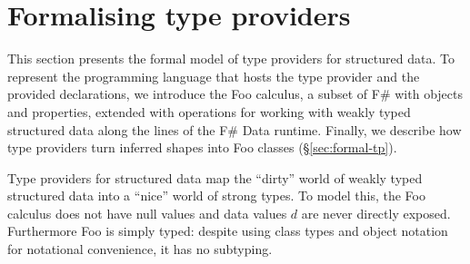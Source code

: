 \documentclass[10pt,preprint,clearpagebib]{sigplanconf}
\newcommand{\kvd}[1]{\textnormal{\textcolor{kvdclr}{\sffamily #1}}}
\begin{document}
% 
%

\section{Formalising type providers}
\label{sec:formal}

This section presents the formal model of type providers for structured data. 
To represent the programming language that hosts the type provider and the
provided declarations, we introduce the Foo calculus,
a subset of F\# with objects and properties, extended with
operations for working with weakly typed structured data along the lines of the F\# Data runtime. Finally, we describe how 
type providers turn inferred shapes into Foo classes (\S\ref{sec:formal-tp}).

Type providers for structured data map the ``dirty'' world of weakly typed 
structured data into a ``nice'' world of strong types. To model this, the Foo calculus
does not have \kvd{null} values and data values $d$ are never directly exposed.  
Furthermore Foo is simply typed: despite using class types and object notation 
for notational convenience, it has no subtyping.

\end{document}
